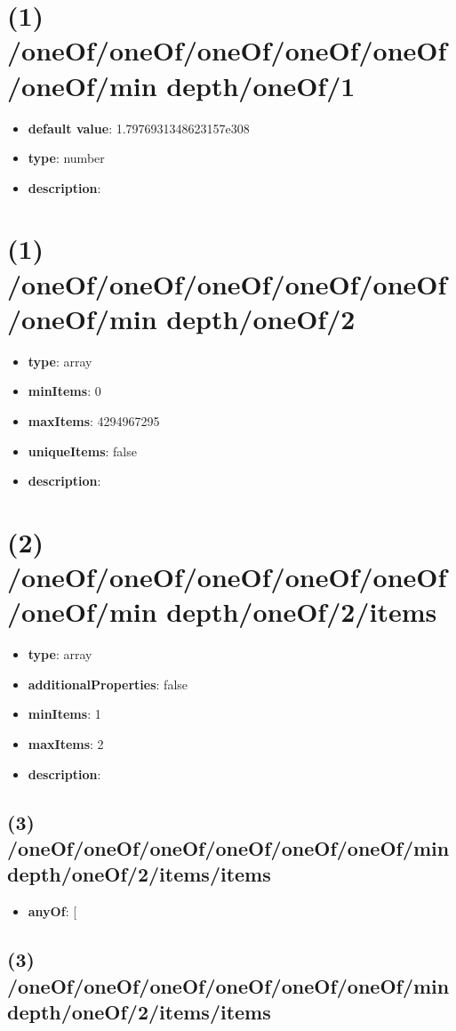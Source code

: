 \section{(1) /oneOf/oneOf/oneOf/oneOf/oneOf/oneOf/min depth/oneOf/1}
\begin{itemize}[leftmargin=1em]\item {\bf default value}: 1.7976931348623157e308
\item {\bf type}: number
\item {\bf description}: 
\end{itemize}\section{(1) /oneOf/oneOf/oneOf/oneOf/oneOf/oneOf/min depth/oneOf/2}
\begin{itemize}[leftmargin=1em]\item {\bf type}: array
\item {\bf minItems}: 0
\item {\bf maxItems}: 4294967295
\item {\bf uniqueItems}: false
\item {\bf description}: 
\end{itemize}\section{(2) /oneOf/oneOf/oneOf/oneOf/oneOf/oneOf/min depth/oneOf/2/items}
\begin{itemize}[leftmargin=2em]\item {\bf type}: array
\item {\bf additionalProperties}: false
\item {\bf minItems}: 1
\item {\bf maxItems}: 2
\item {\bf description}: 
\end{itemize}\subsection{(3) /oneOf/oneOf/oneOf/oneOf/oneOf/oneOf/min depth/oneOf/2/items/items}
\begin{itemize}[leftmargin=3em]\item {\bf anyOf}: [\end{itemize}\subsection{(3) /oneOf/oneOf/oneOf/oneOf/oneOf/oneOf/min depth/oneOf/2/items/items}
